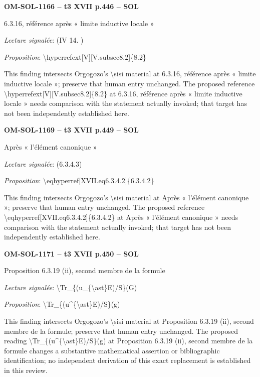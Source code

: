 \par\noindent\textbf{OM-SOL-1166 -- t3 XVII p.446 -- SOL}\par
6.3.16, référence après « limite inductive locale »\par
\emph{Lecture signalée}: (IV 14. )\par
\emph{Proposition}: \textbackslash{}hyperrefext[V][V.subsec8.2]\{8.2\}\par
This finding intersects Orgogozo's \textbackslash{}sisi material at 6.3.16, référence après « limite inductive locale »; preserve that human entry unchanged. The proposed reference \textbackslash{}hyperrefext[V][V.subsec8.2]\{8.2\} at 6.3.16, référence après « limite inductive locale » needs comparison with the statement actually invoked; that target has not been independently established here.\par
\par\noindent\textbf{OM-SOL-1169 -- t3 XVII p.449 -- SOL}\par
Après « l'élément canonique »\par
\emph{Lecture signalée}: (6.3.4.3)\par
\emph{Proposition}: \textbackslash{}eqhyperref[XVII.eq6.3.4.2]\{6.3.4.2\}\par
This finding intersects Orgogozo's \textbackslash{}sisi material at Après « l'élément canonique »; preserve that human entry unchanged. The proposed reference \textbackslash{}eqhyperref[XVII.eq6.3.4.2]\{6.3.4.2\} at Après « l'élément canonique » needs comparison with the statement actually invoked; that target has not been independently established here.\par
\par\noindent\textbf{OM-SOL-1171 -- t3 XVII p.450 -- SOL}\par
Proposition 6.3.19 (ii), second membre de la formule\par
\emph{Lecture signalée}: \textbackslash{}Tr\_\{(u\_\{\textbackslash{}ast\}E)/S\}(G)\par
\emph{Proposition}: \textbackslash{}Tr\_\{(u\textasciicircum{}\{\textbackslash{}ast\}E)/S\}(g)\par
This finding intersects Orgogozo's \textbackslash{}sisi material at Proposition 6.3.19 (ii), second membre de la formule; preserve that human entry unchanged. The proposed reading \textbackslash{}Tr\_\{(u\textasciicircum{}\{\textbackslash{}ast\}E)/S\}(g) at Proposition 6.3.19 (ii), second membre de la formule changes a substantive mathematical assertion or bibliographic identification; no independent derivation of this exact replacement is established in this review.\par
